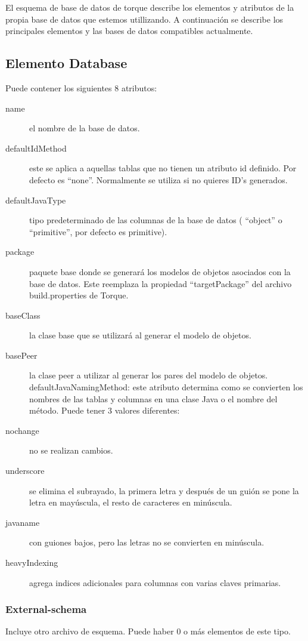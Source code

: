 \documentclass[12pt, oneside]{article}
\begin{document}
	El esquema de base de datos de torque describe los elementos y atributos de la propia base de datos que estemos utillizando. A continuación se describe los principales elementos y las bases de datos compatibles actualmente.

\subsection{Elemento Database}
Puede contener los siguientes 8 atributos:

\begin{description}
	\item[name] el nombre de la base de datos.
	\item[defaultIdMethod] este se aplica a aquellas tablas que no tienen un atributo id definido. Por defecto es “none”. Normalmente se utiliza si no quieres ID’s generados.
	\item[defaultJavaType] tipo predeterminado de las columnas de la base de datos ( “object” o “primitive”, por defecto es primitive).
	\item[package] paquete base donde se generará los modelos de objetos asociados con la base de datos. Este reemplaza la propiedad “targetPackage” del archivo build.properties de Torque.
	\item[baseClass] la clase base que se utilizará al generar el modelo de objetos.
	\item[basePeer] la clase peer a utilizar al generar los pares del modelo de objetos.
	defaultJavaNamingMethod: este atributo determina como se convierten los nombres de las tablas y columnas en una clase Java o el nombre del método. Puede tener 3 valores diferentes:
	\item[nochange] no se realizan cambios.
	\item[underscore] se elimina el subrayado, la primera letra y después de un guión se pone la letra en mayúscula, el resto de caracteres en minúscula.
	\item[javaname] con guiones bajos, pero las letras no se convierten en minúscula.
	\item[heavyIndexing] agrega indices adicionales para columnas con varias claves primarias.
\end{description}

\subsubsection{External-schema}
Incluye otro archivo de esquema. Puede haber 0 o más elementos de este tipo.
\end{document}
